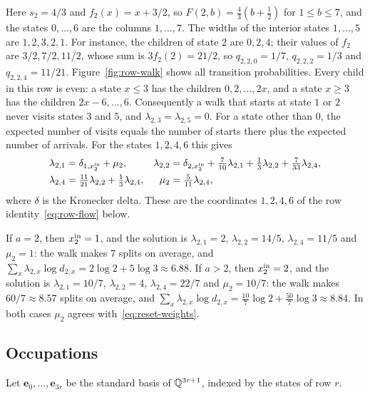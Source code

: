 \begin{example}[Row \(r=2\)]\label{ex:row-two}
Here \(s_2=4/3\) and \(f_2(x)=x+3/2\), so \(F(2,b)=\frac43(b+\frac12)\)
for \(1\le b\le7\), and the states \(0,\ldots,6\) are the columns
\(1,\ldots,7\). The widths of the interior states \(1,\ldots,5\) are
\(1,2,3,2,1\). For instance, the children of state \(2\) are \(0,2,4\);
their values of \(f_2\) are \(3/2,7/2,11/2\), whose sum is
\(3f_2(2)=21/2\), so \(q_{2,2,0}=1/7\), \(q_{2,2,2}=1/3\) and
\(q_{2,2,4}=11/21\). Figure~\ref{fig:row-walk} shows all transition
probabilities. Every child in this row is even: a state \(x\le3\) has the
children \(0,2,\ldots,2x\), and a state \(x\ge3\) has the children
\(2x-6,\ldots,6\). Consequently a walk that starts at state \(1\) or
\(2\) never visits states \(3\) and \(5\), and
\(\lambda_{2,3}=\lambda_{2,5}=0\). For a state other than \(0\), the
expected number of visits equals the number of starts there plus the
expected number of arrivals. For the states \(1,2,4,6\) this gives
\begin{align*}
 \lambda_{2,1}&=\delta_{1,x^{\mathrm{in}}_2}+\mu_2,&
 \lambda_{2,2}&=\delta_{2,x^{\mathrm{in}}_2}+\tfrac7{10}\lambda_{2,1}
   +\tfrac13\lambda_{2,2}+\tfrac7{33}\lambda_{2,4},\\
 \lambda_{2,4}&=\tfrac{11}{21}\lambda_{2,2}+\tfrac13\lambda_{2,4},&
 \mu_2&=\tfrac5{11}\lambda_{2,4},
\end{align*}
where \(\delta\) is the Kronecker delta. These are the coordinates
\(1,2,4,6\) of the row identity~\eqref{eq:row-flow} below.

If \(a=2\), then \(x^{\mathrm{in}}_2=1\), and the solution is \(\lambda_{2,1}=2\),
\(\lambda_{2,2}=14/5\), \(\lambda_{2,4}=11/5\) and \(\mu_2=1\): the walk
makes \(7\) splits on average, and
\(\sum_x\lambda_{2,x}\log d_{2,x}=2\log2+5\log3\approx6.88\). If \(a>2\),
then \(x^{\mathrm{in}}_2=2\), and the solution is \(\lambda_{2,1}=10/7\),
\(\lambda_{2,2}=4\), \(\lambda_{2,4}=22/7\) and \(\mu_2=10/7\): the walk
makes \(60/7\approx8.57\) splits on average, and
\(\sum_x\lambda_{2,x}\log d_{2,x}=\frac{10}7\log2+\frac{50}7\log3
\approx8.84\). In both cases \(\mu_2\) agrees
with~\eqref{eq:reset-weights}.
\end{example}

\subsection{Occupations}
\label{subsec:occupations}

Let \(\mathbf e_0,\ldots,\mathbf e_{3r}\) be the standard
basis of \(\mathbb Q^{3r+1}\), indexed by the states of row \(r\).

